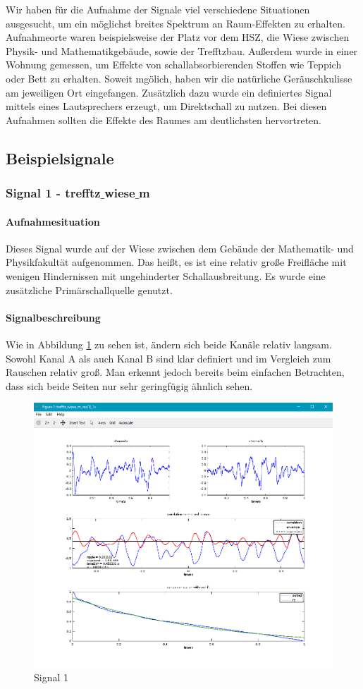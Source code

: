 Wir haben für die Aufnahme der Signale viel verschiedene Situationen ausgesucht, um ein möglichst breites Spektrum an Raum-Effekten zu erhalten. Aufnahmeorte waren beispielsweise der Platz vor dem HSZ, die Wiese zwischen Physik- und Mathematikgebäude, sowie der Trefftzbau. Außerdem wurde in einer Wohnung gemessen, um Effekte von schallabsorbierenden Stoffen wie Teppich oder Bett zu erhalten. Soweit mgölich, haben wir die natürliche Geräuschkulisse am jeweiligen Ort eingefangen. Zusätzlich dazu wurde ein definiertes Signal mittels eines Lautsprechers erzeugt, um Direktschall zu nutzen. Bei diesen Aufnahmen sollten die Effekte des Raumes am deutlichsten hervortreten.
\subsection{Beispielsignale}
\subsubsection{Signal 1 - trefftz$\_$wiese$\_$m}
\paragraph{Aufnahmesituation} Dieses Signal wurde auf der Wiese zwischen dem Gebäude der Mathematik- und Physikfakultät aufgenommen. Das heißt, es ist eine relativ große Freifläche mit wenigen Hindernissen mit ungehinderter Schallausbreitung. Es wurde eine zusätzliche Primärschallquelle genutzt.
\paragraph{Signalbeschreibung} Wie in Abbildung \ref{figure2} zu sehen ist, ändern sich beide Kanäle relativ langsam. Sowohl Kanal A als auch Kanal B sind klar definiert und im Vergleich zum Rauschen relativ groß. Man erkennt jedoch bereits beim einfachen Betrachten, dass sich beide Seiten nur sehr geringfügig ähnlich sehen.
\begin{figure}[ht!]
  \centering
  \includegraphics[scale=0.64]{img/trefftz_wiese_m}
  \caption{Signal 1}
  \label{figure2}
\end{figure}

